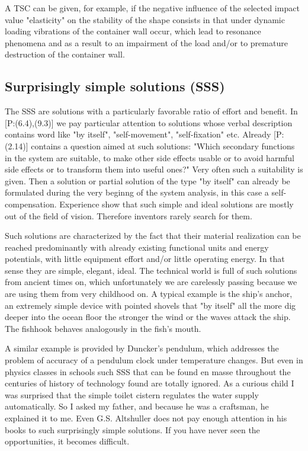 \documentclass[11pt,a4paper]{article}
\begin{document}
A TSC can be given, for example, if the negative influence of the selected
impact value "elasticity" on the stability of the shape consists in that under
dynamic loading vibrations of the container wall occur, which lead to
resonance phenomena and as a result to an impairment of the load and/or to
premature destruction of the container wall.

\subsection{Surprisingly simple solutions (SSS)}

The SSS are solutions with a particularly favorable ratio of effort and
benefit.  In [P:(6.4),(9.3)] we pay particular attention to solutions whose
verbal description contains word like "by itself", "self-movement",
"self-fixation" etc.  Already [P:(2.14)] contains a question aimed at such
solutions: "Which secondary functions in the system are suitable, to make
other side effects usable or to avoid harmful side effects or to transform
them into useful ones?" Very often such a suitability is given. Then a
solution or partial solution of the type "by itself" can already be formulated
during the very beginng of the system analysis, in this case a
self-compensation.  Experience show that such simple and ideal solutions are
mostly out of the field of vision.  Therefore inventors rarely search for
them.

Such solutions are characterized by the fact that their material realization
can be reached predominantly with already existing functional units and energy
potentials, with little equipment effort and/or little operating energy. In
that sense they are simple, elegant, ideal. The technical world is full of
such solutions from ancient times on, which unfortunately we are carelessly
passing because we are using them from very childhood on. A typical example is
the ship's anchor, an extremely simple device with pointed shovels that "by
itself" all the more dig deeper into the ocean floor the stronger the wind or
the waves attack the ship.  The fishhook behaves analogously in the fish's
mouth.

A similar example is provided by Duncker's pendulum, which addresses the
problem of accuracy of a pendulum clock under temperature changes. But even in
physics classes in schools such SSS that can be found en masse throughout the
centuries of history of technology found are totally ignored. As a curious
child I was surprised that the simple toilet cistern regulates the water
supply automatically.  So I asked my father, and because he was a craftsman,
he explained it to me. Even G.S. Altshuller does not pay enough attention in
his books to such surprisingly simple solutions. If you have never seen the
opportunities, it becomes difficult.
\end{document}
